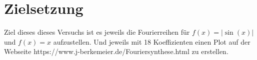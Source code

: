 \section{Zielsetzung}

Ziel dieses dieses Versuchs ist es jeweils die Fourierreihen für $f(x)=|\sin(x)|$ und $f(x)=x$ aufzustellen. 
Und jeweils mit 18 Koeffizienten einen Plot auf der Webseite https://www.j-berkemeier.de/Fouriersynthese.html zu erstellen.